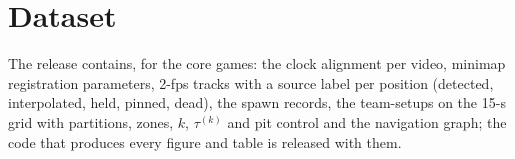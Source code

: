 \section{Dataset}
\label{app:dataset}

The release contains, for the  core games: the clock alignment per video, minimap registration parameters, 2-fps tracks with a source label per position (detected, interpolated, held, pinned, dead), the  spawn records, the  team-setups on the 15-s grid with partitions, zones, $k$, $\tau^{(k)}$ and pit control and the navigation graph; the code that produces every figure and table is released with them.
